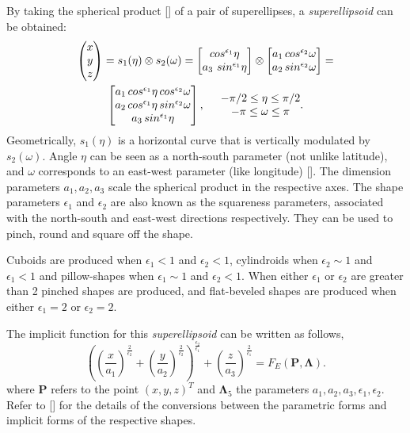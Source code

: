 By taking the spherical product [\citeauthor{H.Barr1981}] of a pair of superellipses, a \textit{superellipsoid} can be obtained:
\begin{multline}
\begin{pmatrix}
x \\ y \\ z
\end{pmatrix} = s_1(\eta) \otimes s_2(\omega) = \begin{bmatrix}
cos^{\epsilon_1}\eta \\ a_3\,\,sin^{\epsilon_1}\eta
\end{bmatrix} \otimes
\begin{bmatrix}
a_1\,cos^{\epsilon_2}\omega \\ a_2\,sin^{\epsilon_2}\omega
\end{bmatrix} = \\  
\begin{bmatrix}
a_1\,cos^{\epsilon_1}\eta\,cos^{\epsilon_2}\omega \\ 
a_2\,cos^{\epsilon_1}\eta\,sin^{\epsilon_2}\omega \\
a_3\,sin^{\epsilon_1}\eta
\end{bmatrix}, \hspace{0.5 cm} \begin{matrix}
-\pi/2 \leq \eta \leq \pi/2 \\
-\pi \leq \omega \leq \pi
\end{matrix}.
\label{eq:SQparam}
\end{multline}
Geometrically, $s_1(\eta)$ is a horizontal curve that is vertically modulated by $s_2(\omega)$. Angle $\eta$ can be seen as a north-south parameter (not unlike latitude), and $\omega$ corresponds to an east-west parameter (like longitude) [\citeauthor{H.Barr1981}]. The dimension parameters $a_1, a_2, a_3$ scale the spherical product in the respective axes. The shape parameters $\epsilon_1$ and $\epsilon_2$ are also known as the squareness parameters, associated with the north-south and east-west directions respectively. They can be used to pinch, round and square off the shape. 

Cuboids are produced when $\epsilon_1 < 1$ and $\epsilon_2 < 1$, cylindroids when $\epsilon_2 \sim 1$ and $\epsilon_1 < 1$ and pillow-shapes when $\epsilon_1 \sim 1$ and $\epsilon_2 < 1$. When either $\epsilon_1$ or $\epsilon_2$ are greater than 2 pinched shapes are produced, and flat-beveled shapes are produced when either $\epsilon_1 = 2$ or $\epsilon_2 = 2$.

The implicit function for this \textit{superellipsoid} can be written as follows,
\begin{equation}
\left(\left(\frac{x}{a_1}\right)^{\frac{2}{\epsilon_2}} + \left(\frac{y}{a_2}\right)^{\frac{2}{\epsilon_2}} \right)^{\frac{\epsilon_2}{\epsilon_1}} + \left(\frac{z}{a_3}\right)^\frac{2}{\epsilon_1} = F_E(\textbf{P}, \mathbf{\Lambda}).
\label{eq:F}
\end{equation}
where $\textbf{P}$ refers to the point $(x,y,z)^T$ and $\mathbf{\Lambda}_5$ the parameters $a_1, a_2, a_3, \epsilon_1, \epsilon_2$. Refer to [\citeauthor{Jaklic2000}] for the details of the conversions between the parametric forms and implicit forms of the respective shapes.

